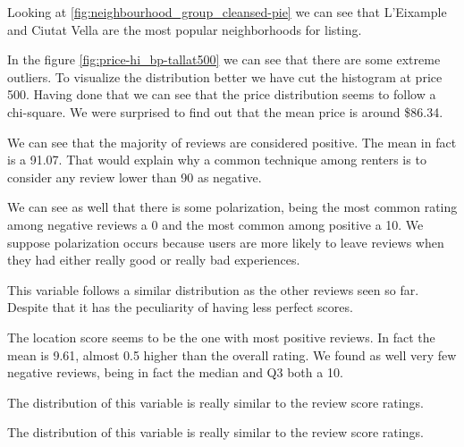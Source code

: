 

Looking at \ref{fig:neighbourhood_group_cleansed-pie} we can see that L'Eixample
and Ciutat Vella are the most popular neighborhoods for listing.


In the figure \ref{fig:price-hi_bp-tallat500} we can see that there are some extreme outliers. To visualize the distribution better we have cut the histogram at price 500. Having done that we can see that the price distribution seems to follow a chi-square. We were surprised to find out that the mean price is 
around \$86.34.



We can see that the majority of reviews are considered positive. The mean in fact is 
a 91.07. That would explain why a common technique among renters is to consider 
any review lower than 90 as negative. 

We can see as well that there is some polarization, being the most common rating among 
negative reviews a 0 and the most common among positive a 10. We suppose polarization occurs
because users are more likely to leave reviews when they had either really good or 
really bad experiences.



This variable follows a similar distribution as the other reviews seen so far. Despite that
it has the peculiarity of having less perfect scores.



The location score seems to be the one with most positive reviews. In fact the mean is 9.61, almost 0.5 higher than the overall rating. We found as well
very few negative reviews, being in fact the median and Q3 both a 10.



The distribution of this variable is really similar to the review score ratings.



The distribution of this variable is really similar to the review score ratings.


